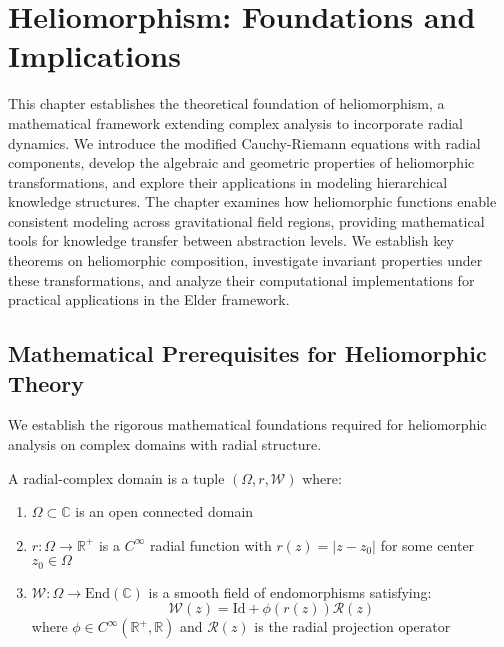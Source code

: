 \chapter{Heliomorphism: Foundations and Implications}

\begin{tcolorbox}[colback=DarkSkyBlue!5!white,colframe=DarkSkyBlue!75!black,title=Chapter Summary]
This chapter establishes the theoretical foundation of heliomorphism, a mathematical framework extending complex analysis to incorporate radial dynamics. We introduce the modified Cauchy-Riemann equations with radial components, develop the algebraic and geometric properties of heliomorphic transformations, and explore their applications in modeling hierarchical knowledge structures. The chapter examines how heliomorphic functions enable consistent modeling across gravitational field regions, providing mathematical tools for knowledge transfer between abstraction levels. We establish key theorems on heliomorphic composition, investigate invariant properties under these transformations, and analyze their computational implementations for practical applications in the Elder framework.
\end{tcolorbox}

\section{Mathematical Prerequisites for Heliomorphic Theory}

We establish the rigorous mathematical foundations required for heliomorphic analysis on complex domains with radial structure.

\begin{definition}
\label{def:radial_complex_domain}
A radial-complex domain is a tuple $(\Omega, r, \mathcal{W})$ where:
\begin{enumerate}
\item $\Omega \subset \mathbb{C}$ is an open connected domain
\item $r: \Omega \to \mathbb{R}^+$ is a $C^\infty$ radial function with $r(z) = |z - z_0|$ for some center $z_0 \in \Omega$
\item $\mathcal{W}: \Omega \to \text{End}(\mathbb{C})$ is a smooth field of endomorphisms satisfying:
   \begin{equation}
   \mathcal{W}(z) = \text{Id} + \phi(r(z)) \mathcal{R}(z)
   \end{equation}
   where $\phi \in C^\infty(\mathbb{R}^+, \mathbb{R})$ and $\mathcal{R}(z)$ is the radial projection operator
\end{enumerate}
\end{definition}

